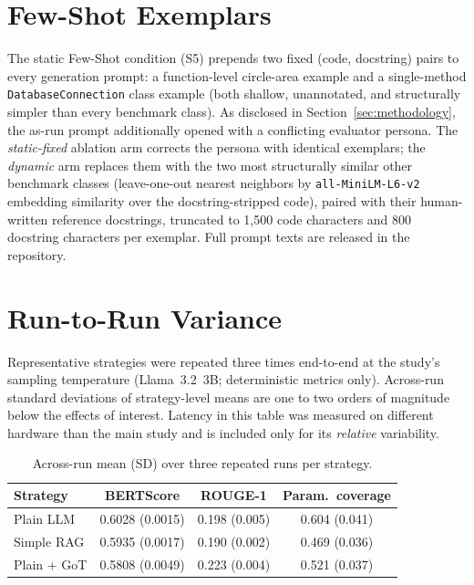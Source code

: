 \documentclass[pdflatex,sn-mathphys-ay]{sn-jnl}%
\theoremstyle{thmstyleone}%
\theoremstyle{thmstyletwo}%
\theoremstyle{thmstylethree}%
\begin{document}
\section{Few-Shot Exemplars}
\label{sec:appendix-fewshot}
The static Few-Shot condition (S5) prepends two fixed (code, docstring) pairs to every generation prompt: a function-level circle-area example and a single-method \texttt{DatabaseConnection} class example (both shallow, unannotated, and structurally simpler than every benchmark class). As disclosed in Section~\ref{sec:methodology}, the as-run prompt additionally opened with a conflicting evaluator persona. The \emph{static-fixed} ablation arm corrects the persona with identical exemplars; the \emph{dynamic} arm replaces them with the two most structurally similar other benchmark classes (leave-one-out nearest neighbors by \texttt{all-MiniLM-L6-v2} embedding similarity over the docstring-stripped code), paired with their human-written reference docstrings, truncated to 1{,}500 code characters and 800 docstring characters per exemplar. Full prompt texts are released in the repository.

\section{Run-to-Run Variance}
\label{sec:appendix-variance}
Representative strategies were repeated three times end-to-end at the study's sampling temperature (Llama~3.2~3B; deterministic metrics only). Across-run standard deviations of strategy-level means are one to two orders of magnitude below the effects of interest. Latency in this table was measured on different hardware than the main study and is included only for its \emph{relative} variability.

\begin{table}[h]
\centering
\small
\caption{Across-run mean (SD) over three repeated runs per strategy.}
\label{tab:variance}
\begin{tabular}{lccc}
\toprule
\textbf{Strategy} & \textbf{BERTScore} & \textbf{ROUGE-1} & \textbf{Param.\ coverage} \\
\midrule
Plain LLM   & 0.6028 (0.0015) & 0.198 (0.005) & 0.604 (0.041) \\
Simple RAG  & 0.5935 (0.0017) & 0.190 (0.002) & 0.469 (0.036) \\
Plain + GoT & 0.5808 (0.0049) & 0.223 (0.004) & 0.521 (0.037) \\
\bottomrule
\end{tabular}
\end{table}
\end{document}
